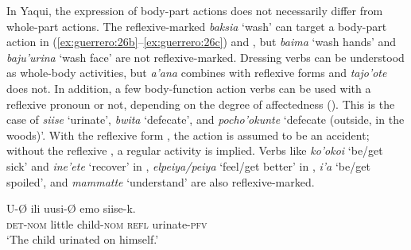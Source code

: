 \documentclass[output=paper]{langscibook}
\begin{document}



\z
\z



In Yaqui, the expression of body-part actions does not necessarily differ from whole-part actions. The reflexive-marked \textit{baksia} ‘wash’ can target a body-part action in (\ref{ex:guerrero:26b}--\ref{ex:guerrero:26c}) and , but \textit{baima} ‘wash hands’ and \textit{baju’urina} ‘wash face’ are not reflexive-marked. Dressing verbs can be understood as whole-body activities, but \textit{a’ana} combines with reflexive forms and \textit{tajo’ote} does not. In addition, a few body-function action verbs can be used with a reflexive pronoun or not, depending on the degree of affectedness (\citealt{FrajzyngierCurl1999}). This is the case of \textit{siise} ‘urinate’, \textit{bwita} ‘defecate’, and \textit{pocho’okunte} ‘defecate (outside, in the woods)’. With the reflexive form , the action is assumed to be an accident; without the reflexive , a regular activity is implied. Verbs like \textit{ko’okoi} ‘be/get sick’ and \textit{ine’ete} ‘recover’ in , \textit{elpeiya/peiya} ‘feel/get better’ in , \textit{i’a} ‘be/get spoiled’, and \textit{mammatte} ‘understand’ are also reflexive-marked.



\ea%
    \label{ex:guerrero:29}

\ea
\label{ex:guerrero:29a}
\gll U-Ø   ili  uusi-Ø  emo  siise-k.\\
  \textsc{det-nom}    little   child-\textsc{nom}   \textsc{refl}   urinate-\textsc{pfv}\\
\glt ‘The child urinated on himself.’
\end{document}
